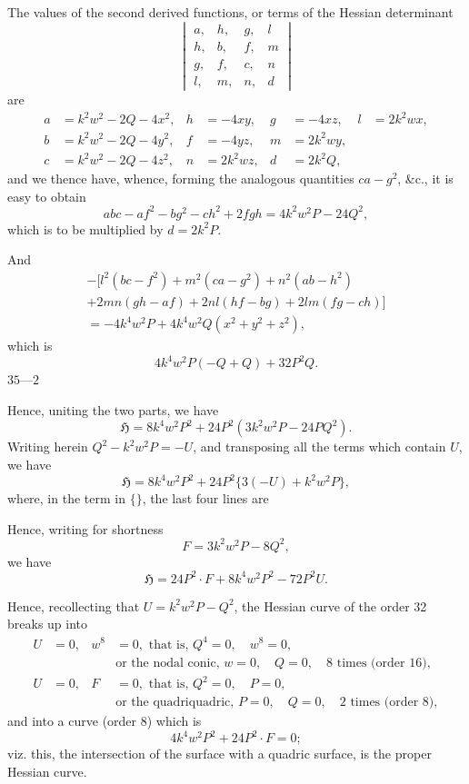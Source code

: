 \documentclass[12pt,a4paper]{article}
\theoremstyle{cayley}
\theoremstyle{definition}
\numberwithin{equation}{section}
\begin{document}
The values of the second derived functions, or terms of the Hessian determinant
\[
\begin{vmatrix}
a, & h, & g, & l \\
h, & b, & f, & m \\
g, & f, & c, & n \\
l, & m, & n, & d
\end{vmatrix}
\]
are
\begin{align*}
a &= k^2 w^2 - 2Q - 4x^2, & h &= -4xy, & g &= -4xz, & l &= 2k^2 w x, \\
b &= k^2 w^2 - 2Q - 4y^2, & f &= -4yz, & m &= 2k^2 w y, \\
c &= k^2 w^2 - 2Q - 4z^2, & n &= 2k^2 w z, & d &= 2k^2 Q,
\end{align*}
and we thence have, whence, forming the analogous quantities $ca - g^2$, \&c., it is easy to obtain
\[
abc - af^2 - bg^2 - ch^2 + 2fgh = 4k^2 w^2 P - 24Q^2,
\]
which is to be multiplied by $d = 2k^2 P$.

And
\begin{multline*}
-[l^2(bc - f^2) + m^2(ca - g^2) + n^2(ab - h^2) \\
+ 2mn(gh - af) + 2nl(hf - bg) + 2lm(fg - ch)] \\
= -4k^4 w^2 P + 4k^4 w^2 Q(x^2 + y^2 + z^2),
\end{multline*}
which is
\[
4k^4 w^2 P(-Q + Q) + 32P^2 Q.
\]
\hfill $35\text{---}2$

Hence, uniting the two parts, we have
\[
\mathfrak{H} = 8k^4 w^2 P^2 + 24P^2(3k^2 w^2 P - 24PQ^2).
\]
Writing herein $Q^2 - k^2 w^2 P = -U$, and transposing all the terms which contain $U$, we have
\[
\mathfrak{H} = 8k^4 w^2 P^2 + 24P^2 \{3(-U) + k^2 w^2 P\},
\]
where, in the term in $\{\}$, the last four lines are

Hence, writing for shortness
\[
F = 3k^2 w^2 P - 8Q^2,
\]
we have
\[
\mathfrak{H} = 24P^2 \cdot F + 8k^4 w^2 P^2 - 72P^2 U.
\]

Hence, recollecting that $U = k^2 w^2 P - Q^2$, the Hessian curve of the order 32 breaks up into
\begin{align*}
U &= 0, & w^8 &= 0, \text{ that is, } Q^4 = 0, \quad w^8 = 0, \\
  &    &      & \text{or the nodal conic, } w = 0, \quad Q = 0, \quad 8 \text{ times (order 16)}, \\
U &= 0, & F &= 0, \text{ that is, } Q^2 = 0, \quad P = 0, \\
  &    &      & \text{or the quadriquadric, } P = 0, \quad Q = 0, \quad 2 \text{ times (order 8)},
\end{align*}
and into a curve (order 8) which is
\[
4k^4 w^2 P^2 + 24P^2 \cdot F = 0;
\]
viz. this, the intersection of the surface with a quadric surface, is the proper Hessian curve.
\end{document}
